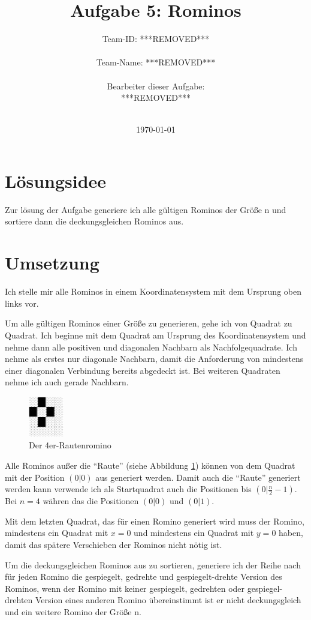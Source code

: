 \documentclass[a4paper,10pt]{scrartcl}
\title{Aufgabe 5: Rominos}
\author{Team-ID: ***REMOVED*** \\\\
	    Team-Name: ***REMOVED*** \\\\
	    Bearbeiter dieser Aufgabe: \\
	    ***REMOVED***\\\\}
\date{\today}
\begin{document}
\maketitle
\tableofcontents

\section{Lösungsidee}
Zur lösung der Aufgabe generiere ich alle gültigen Rominos der Größe n und sortiere dann die deckungsgleichen Rominos aus.

\section{Umsetzung}
Ich stelle mir alle Rominos in einem Koordinatensystem mit dem Ursprung oben links vor.

Um alle gültigen Rominos einer Größe zu generieren, gehe ich von Quadrat zu Quadrat. Ich beginne mit dem Quadrat am Ursprung des Koordinatensystem und nehme dann alle positiven und diagonalen Nachbarn als Nachfolgequadrate. Ich nehme als erstes nur diagonale Nachbarn, damit die Anforderung von mindestens einer diagonalen Verbindung bereits abgedeckt ist. Bei weiteren Quadraten nehme ich auch gerade Nachbarn.

\begin{figure}[h]
  \centering
  \includegraphics{raute.jpg}
  \caption{Der 4er-Rautenromino}
  \label{fig:raute}
\end{figure}

Alle Rominos außer die "`Raute"' (siehe Abbildung \ref{fig:raute}) können von dem Quadrat mit der Position \((0|0)\) aus generiert werden. Damit auch die "`Raute"' generiert werden kann verwende ich als Startquadrat auch die Positionen bis \((0|\frac{n}{2}-1)\). Bei \(n=4\) währen das die Positionen \((0|0)\) und \((0|1)\).

Mit dem letzten Quadrat, das für einen Romino generiert wird muss der Romino, mindestens ein Quadrat mit \(x=0\) und mindestens ein Quadrat mit \(y=0\) haben, damit das spätere Verschieben der Rominos nicht nötig ist.

Um die deckungsgleichen Rominos aus zu sortieren, generiere ich der Reihe nach für jeden Romino die gespiegelt, gedrehte und gespiegelt-drehte Version des Rominos, wenn der Romino mit keiner gespiegelt, gedrehten oder gespiegel-drehten Version eines anderen Romino übereinstimmt ist er nicht deckungsgleich und ein weitere Romino der Größe n.
\end{document}
